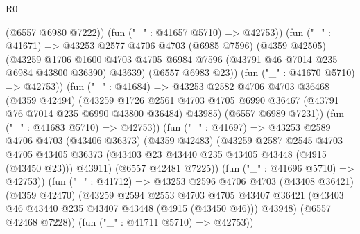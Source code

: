 \begin{lexlean}{R0}
\begin{coremodule}
                          (@6557 @6980 @7222))
                        (fun ("_" : @41657 @5710) => @42753))
                      (fun ("_" : @41671) =>
                      @43253
                        @2577
                        @4706
                        @4703
                        (@6985 @7596)
                        (@4359 @42505)
                        (@43259
                          @1706
                          @1600
                          @4703
                          @4705
                          @6984
                          @7596
                          (@43791 @46 @7014 @235 @6984 @43800 @36390)
                          @43639)
                        (@6557 @6983 @23))
                      (fun ("_" : @41670 @5710) => @42753))
                    (fun ("_" : @41684) =>
                    @43253
                      @2582
                      @4706
                      @4703
                      @36468
                      (@4359 @42494)
                      (@43259
                        @1726
                        @2561
                        @4703
                        @4705
                        @6990
                        @36467
                        (@43791 @76 @7014 @235 @6990 @43800 @36484)
                        @43985)
                      (@6557 @6989 @7231))
                    (fun ("_" : @41683 @5710) => @42753))
                  (fun ("_" : @41697) =>
                  @43253
                    @2589
                    @4706
                    @4703
                    (@43406 @36373)
                    (@4359 @42483)
                    (@43259
                      @2587
                      @2545
                      @4703
                      @4705
                      @43405
                      @36373
                      (@43403 @23 @43440 @235 @43405 @43448 (@4915 (@43450 @23)))
                      @43911)
                    (@6557 @42481 @7225))
                  (fun ("_" : @41696 @5710) => @42753))
                (fun ("_" : @41712) =>
                @43253
                  @2596
                  @4706
                  @4703
                  (@43408 @36421)
                  (@4359 @42470)
                  (@43259
                    @2594
                    @2553
                    @4703
                    @4705
                    @43407
                    @36421
                    (@43403 @46 @43440 @235 @43407 @43448 (@4915 (@43450 @46)))
                    @43948)
                  (@6557 @42468 @7228))
                (fun ("_" : @41711 @5710) => @42753))

\end{coremodule}
\end{lexlean}
